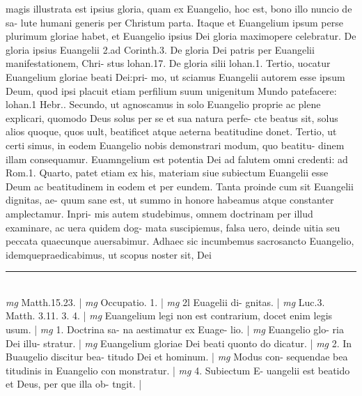 \documentclass{article}
\begin{document}
\begin{pages}
magis illustrata est ipsius gloria, quam ex Euangelio, hoc est, bono illo nuncio de sa- lute humani generis per Christum parta. Itaque et Euangelium ipsum perse plurimum gloriae habet, et Euangelio ipsius Dei gloria maximopere celebratur. De gloria ipsius Euangelii 2.ad Corinth.3. De gloria Dei patris per Euangelii manifestationem, Chri- stus lohan.17. De gloria silii lohan.1. Tertio, uocatur Euangelium gloriae beati Dei:pri- mo, ut sciamus Euangelii autorem esse ipsum Deum, quod ipsi placuit etiam perfilium suum unigenitum Mundo patefacere: lohan.1 Hebr.. Secundo, ut agnoscamus in solo Euangelio proprie ac plene explicari, quomodo Deus solus per se et sua natura perfe- cte beatus sit, solus alios quoque, quos uult, beatificet atque aeterna beatitudine donet. Tertio, ut certi simus, in eodem Euangelio nobis demonstrari modum, quo beatitu- dinem illam consequamur. Euamngelium est potentia Dei ad falutem omni credenti: ad Rom.1. Quarto, patet etiam ex his, materiam siue subiectum Euangelii esse Deum ac beatitudinem in eodem et per eundem. Tanta proinde cum sit Euangelii dignitas, ae- quum sane est, ut summo in honore habeamus atque constanter amplectamur. Inpri- mis autem studebimus, omnem doctrinam per illud examinare, ac uera quidem dog- mata suscipiemus, falsa uero, deinde uitia seu peccata quaecunque  auersabimur. Adhaec sic incumbemus sacrosancto Euangelio, idemquepraedicabimus, ut scopus noster sit, Dei  \pend
\vspace{0.5cm}\noindent
\vspace{0.2cm}\rule{1cm}{0.2pt}\\ 
\hspace{0.2cm}\textit{mg}
\footnotesize Matth.15.23. 
\normalsize| 
\hspace{0.2cm}\textit{mg}
\footnotesize Occupatio. 1. 
\normalsize| 
\hspace{0.2cm}\textit{mg}
\footnotesize 2l Euagelii di- gnitas. 
\normalsize| 
\hspace{0.2cm}\textit{mg}
\footnotesize Luc.3. Matth. 3.11. 3. 4. 
\normalsize| 
\hspace{0.2cm}\textit{mg}
\footnotesize Euangelium legi non est contrarium, docet enim legis usum. 
\normalsize| 
\hspace{0.2cm}\textit{mg}
\footnotesize 1. Doctrina sa- na aestimatur ex Euage- lio. 
\normalsize| 
\hspace{0.2cm}\textit{mg}
\footnotesize Euangelio glo- ria Dei illu- stratur. 
\normalsize| 
\hspace{0.2cm}\textit{mg}
\footnotesize Euangelium gloriae Dei beati quonto do dicatur. 
\normalsize| 
\hspace{0.2cm}\textit{mg}
\footnotesize 2. In Buaugelio discitur bea- titudo Dei et hominum. 
\normalsize| 
\hspace{0.2cm}\textit{mg}
\footnotesize Modus con- sequendae bea titudinis in Euangelio con monstratur. 
\normalsize| 
\hspace{0.2cm}\textit{mg}
\footnotesize 4. Subiectum E- uangelii est beatido et Deus, per que illa ob- tngit. 
\normalsize| 

\end{pages}
\end{document}
